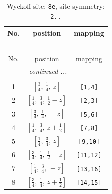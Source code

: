 \documentclass[fleqn,8pt]{jsarticle}
\begin{document}
\renewcommand{\arraystretch}{1.2}
\begin{longtable}{ccc}
\caption{Wyckoff site: {\tt 8e}, site symmetry: {\tt 2..}}
 \\
 \hline \hline
No. & position & mapping \\ \hline \endfirsthead

\multicolumn{2}{l}{\tablename\ \thetable{}} \\
 \hline \hline
No. & position & mapping \\ \hline \endhead

 \hline \hline
\multicolumn{2}{r}{\footnotesize\it continued ...} \\ \endfoot

 \hline \hline
\multicolumn{2}{r}{} \\ \endlastfoot

1 & $\left[ \frac{3}{4},\, \frac{1}{4},\, z \right]$ & {\tt [1,4]} \\ \hline
2 & $\left[ \frac{1}{4},\, \frac{3}{4},\, \frac{1}{2} - z \right]$ & {\tt [2,3]} \\ \hline
3 & $\left[ \frac{3}{4},\, \frac{1}{4},\, - z \right]$ & {\tt [5,6]} \\ \hline
4 & $\left[ \frac{1}{4},\, \frac{3}{4},\, z + \frac{1}{2} \right]$ & {\tt [7,8]} \\ \hline
5 & $\left[ \frac{1}{4},\, \frac{3}{4},\, z \right]$ & {\tt [9,10]} \\ \hline
6 & $\left[ \frac{3}{4},\, \frac{1}{4},\, \frac{1}{2} - z \right]$ & {\tt [11,12]} \\ \hline
7 & $\left[ \frac{1}{4},\, \frac{3}{4},\, - z \right]$ & {\tt [13,16]} \\ \hline
8 & $\left[ \frac{3}{4},\, \frac{1}{4},\, z + \frac{1}{2} \right]$ & {\tt [14,15]} \\
\end{longtable}
\renewcommand{\arraystretch}{1.2}
\end{document}
